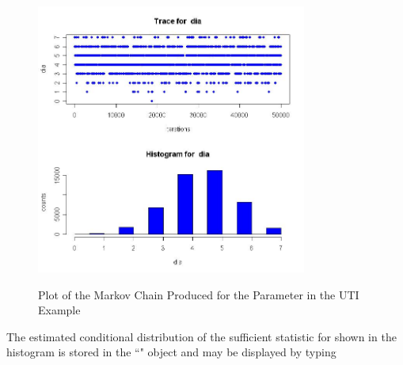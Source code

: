 \documentclass[article, shortnames]{jss}
\begin{document}
\begin{figure}[h]
\begin{center}
\label{fig1}
\includegraphics[width=3.5in,height=3.5in]{images/dia.jpg}
\caption {Plot of the Markov Chain Produced for the 
Parameter in the UTI Example}
\end{center}
\end{figure}

The estimated conditional distribution of the sufficient statistic
for  shown in the histogram is stored in the
``" object and may be displayed by typing
\begin{CodeChunk}
\end{CodeChunk}
\end{document}
